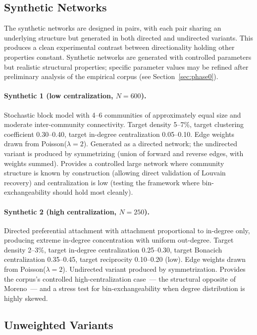 \documentclass[11pt]{article}
\begin{document}
\subsection{Synthetic Networks}

The synthetic networks are designed in pairs, with each pair sharing an underlying structure but generated in both directed and undirected variants. This produces a clean experimental contrast between directionality holding other properties constant. Synthetic networks are generated with controlled parameters but realistic structural properties; specific parameter values may be refined after preliminary analysis of the empirical corpus (see Section~\ref{sec:phase0}).

\paragraph{Synthetic 1 (low centralization, $N = 600$).} Stochastic block model with 4--6 communities of approximately equal size and moderate inter-community connectivity. Target density 5--7\%, target clustering coefficient 0.30--0.40, target in-degree centralization 0.05--0.10. Edge weights drawn from Poisson($\lambda = 2$). Generated as a directed network; the undirected variant is produced by symmetrizing (union of forward and reverse edges, with weights summed). Provides a controlled large network where community structure is known by construction (allowing direct validation of Louvain recovery) and centralization is low (testing the framework where bin-exchangeability should hold most cleanly).

\paragraph{Synthetic 2 (high centralization, $N = 250$).} Directed preferential attachment with attachment proportional to in-degree only, producing extreme in-degree concentration with uniform out-degree. Target density 2--3\%, target in-degree centralization 0.25--0.30, target Bonacich centralization 0.35--0.45, target reciprocity 0.10--0.20 (low). Edge weights drawn from Poisson($\lambda = 2$). Undirected variant produced by symmetrization. Provides the corpus's controlled high-centralization case~--- the structural opposite of Moreno~--- and a stress test for bin-exchangeability when degree distribution is highly skewed.

\subsection{Unweighted Variants}
\end{document}
